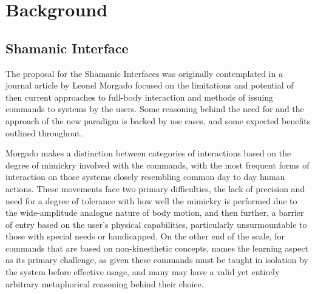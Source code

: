 \chapter{Background} \label{chap:back}

\section*{}
\begin{dummied}
\end{dummied}


\section{Shamanic Interface} \label{sec:shamanic_interface}
    The proposal for the Shamanic Interfaces was originally contemplated in a journal article by Leonel Morgado \cite{MOR2013} focused on the limitations and potential of then current approaches to full-body interaction and methods of issuing commands to systems by the users. Some reasoning behind the need for and the approach of the new paradigm is backed by use cases, and some expected benefits outlined throughout.
    
    Morgado makes a distinction between categories of interactions based on the degree of mimickry involved with the commands, with the most frequent forms of interaction on those systems closely resembling common day to day human actions. These movements face two primary difficulties, the lack of precision and need for a degree of tolerance with how well the mimickry is performed due to the wide-amplitude analogue nature of body motion, and then further, a barrier of entry based on the user's physical capabilities, particularly unsurmountable to those with special needs or handicapped. On the other end of the scale, for commands that are based on non-kinesthetic concepts, names the learning aspect as its primary challenge, as given these commands must be taught in isolation by the system before effective usage, and many may have a valid yet entirely arbitrary metaphorical reasoning behind their choice.
    
